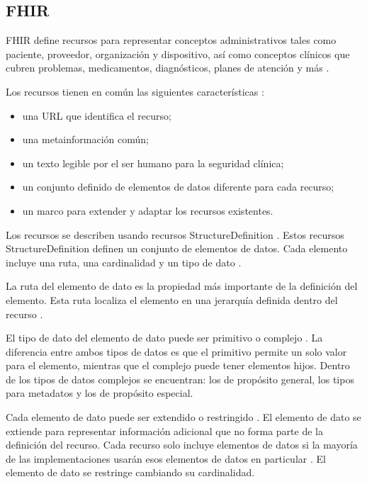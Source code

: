 \subsection{FHIR}

FHIR define recursos para representar conceptos administrativos tales como paciente, proveedor, organización y dispositivo, así como conceptos clínicos que cubren problemas, medicamentos, diagnósticos, planes de atención y más \cite{FHIRResourceList}.

Los recursos tienen en común las siguientes características \cite{FHIRDeveloper}:
\begin{itemize}
  \item una URL que identifica el recurso;
  \item una metainformación común;
  \item un texto legible por el ser humano para la seguridad clínica;
  \item un conjunto definido de elementos de datos diferente para cada recurso;
  \item un marco para extender y adaptar los recursos existentes.
\end{itemize}

Los recursos se describen usando recursos StructureDefinition \cite{FHIRStructureDefinition}. Estos recursos StructureDefinition definen un conjunto de elementos de datos. Cada elemento incluye una ruta, una cardinalidad y un tipo de dato \cite{FHIRElementDefinition}.

La ruta del elemento de dato es la propiedad más importante de la definición del elemento. Esta ruta localiza el elemento en una jerarquía definida dentro del recurso \cite{FHIRElementDefinition}.

El tipo de dato del elemento de dato puede ser primitivo o complejo \cite{FHIRDataTypes}. La diferencia entre ambos tipos de datos es que el primitivo permite un solo valor para el elemento,  mientras que el complejo puede tener elementos hijos. Dentro de los tipos de datos complejos se encuentran: los de propósito general,  los tipos para metadatos y los de propósito especial.

Cada elemento de dato puede ser extendido o restringido \cite{FHIRProfiling}. El elemento de dato se extiende para representar información adicional que no forma parte de la definición del recurso\cite{FHIRExtensibility}. Cada recurso solo incluye elementos de datos si la mayoría de las implementaciones usarán esos elementos de datos en particular \cite{FHIRArchitecture}. El elemento de dato se restringe cambiando su cardinalidad.

